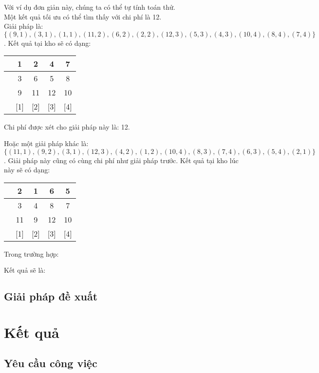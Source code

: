 \documentclass[11pt]{article}
\begin{document}
Với ví dụ đơn giản này, chúng ta có thể tự tính toán thử.\\ 
Một kết quả tối ưu có thể tìm thấy với chi phí là 12.\\
Giải pháp là: $\{(9,1), (3,1), (1,1), (11,2), (6,2), (2,2), (12,3), (5,3), (4,3), (10,4), (8,4), (7,4)\}$.
Kết quả tại kho sẽ có dạng:
\begin{center}
\begin{tabular}{|c|c|c|c|c|}
\hline & 1 & 2 & 4 & 7 \\
\hline & 3 & 6 & 5 & 8 \\
\hline & 9 & 11 & 12 & 10 \\
\hline [0] & [1] & [2] & [3] & [4]
\end{tabular}
\end{center}
Chi phí được xét cho giải pháp này là: 12.

Hoặc một giải pháp khác là: $\{(11,1), (9,2), (3,1), (12,3), (4,2), (1,2), (10,4), (8,3), (7,4), (6,3), (5,4), (2,1)\}$.
Giải pháp này cũng có cùng chi phí như giải pháp trước.
Kết quả tại kho lúc này sẽ có dạng:
\begin{center}
\begin{tabular}{|c|c|c|c|c|}
\hline & 2 & 1 & 6 & 5 \\
\hline & 3 & 4 & 8 & 7 \\
\hline & 11 & 9 & 12 & 10 \\
\hline [0] & [1] & [2] & [3] & [4]
\end{tabular}
\end{center}

Trong trường hợp:

Kết quả sẽ là:

\subsection{\texorpdfstring{Giải pháp đề xuất}{Proposed approach}}\label{algoPropos}


\section{\texorpdfstring{Kết quả}{Experimental results}}\label{result}


\subsection{\texorpdfstring{Yêu cầu công việc}{Requirement}}\label{mission}
\end{document}
